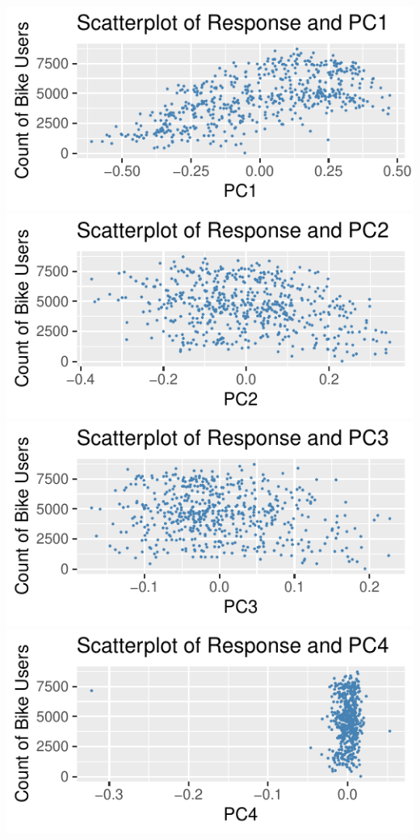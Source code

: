 \documentclass[
]{article}
\begin{document}
\includegraphics{ST-563-Final-Project_files/figure-latex/PCA_scatter-1.pdf}
\includegraphics{ST-563-Final-Project_files/figure-latex/PCA_scatter-2.pdf}
\includegraphics{ST-563-Final-Project_files/figure-latex/PCA_scatter-3.pdf}
\includegraphics{ST-563-Final-Project_files/figure-latex/PCA_scatter-4.pdf}
\end{document}
